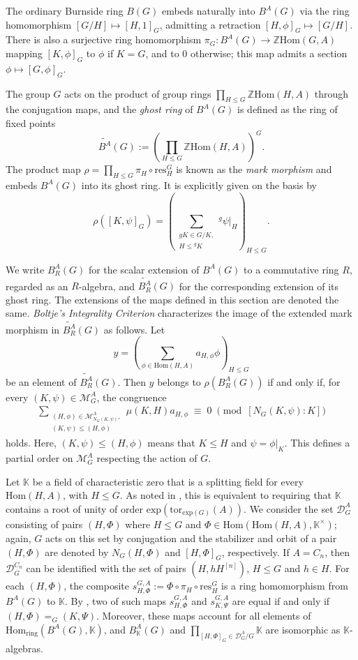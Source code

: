 \documentclass[letterpaper,12pt]{article}
\theoremstyle{plain}
\theoremstyle{definition}
\newcommand{\Z}{\mathbb{Z}}
\newcommand{\K}{\mathbb{K}}
\newcommand{\BAG}{B^A(G)}
\newcommand{\gBAG}{\widetilde{B^A}(G)}
\newcommand{\BAKG}{B^A_{\mathbb{K}}(G)}
\newcommand{\MAG}{\mathcal{M}^A_G}
\newcommand{\DAG}{\mathcal{D}^A_G}
\newcommand{\DnG}{\mathcal{D}^{C_n}_G}
\newcommand{\sGAHPhi}{s^{G,A}_{H,\Phi}}
\begin{document}
The ordinary Burnside ring $B(G)$ embeds naturally into $B^A(G)$ via the ring homomorphism $[G/H]\mapsto[H,1]_G$, admitting a retraction $[H,\phi]_G\mapsto [G/H]$. There is also a surjective ring homomorphism $\pi_G:\BAG\longrightarrow \Z\mathrm{Hom}(G,A)$ mapping $[K,\phi]_G$ to $\phi$ if $K=G$, and to $0$ otherwise; this map admits a section $\phi\mapsto [G,\phi]_G$. 

The group $G$ acts on the product of group rings $\prod_{H\leq G}\Z\mathrm{Hom}(H,A)$ through the conjugation maps, and the \textit{ghost ring} of $\BAG$ is defined as the ring of fixed points 
$$\gBAG:=\left(\prod_{H\leq G}\Z\mathrm{Hom}(H,A)\right)^G.$$ 
The product map $\rho=\prod_{H\leq G}\pi_H\circ \mathrm{res}^G_H$ is known as the \textit{mark morphism} and embeds $\BAG$ into its ghost ring. It is explicitly given on the basis by
\[\rho\left([K,\psi]_G\right)= \left(\sum_{\substack{
gK\in G/K,\\
H\leq {^gK}
}}{^g\psi|_H}\right)_{H\leq G}.\]

We write $B^A_R(G)$ for the scalar extension of $\BAG$ to a commutative ring $R$, regarded as an $R$-algebra, and $\widetilde{B^A_R}(G)$ for the corresponding extension of its ghost ring. The extensions of the maps defined in this section are denoted the same. \textit{Boltje's Integrality Criterion} \cite[Theorem 2.2]{Bol1} characterizes the image of the extended mark morphism in $\widetilde{B^A_R}(G)$ as follows. Let
$$y=\left(\sum_{\phi\in \mathrm{Hom}(H,A)}a_{H,\phi}\phi\right)_{H\leq G}$$ 
be an element of $\widetilde{B^A_R}(G)$. Then $y$ belongs to $\rho\left(B^A_R(G)\right)$ if and only if, for every $(K,\psi)\in \MAG$, the congruence
\begin{align}
    \sum_{
    \substack{
    (H,\phi)\in \mathcal{M}^A_{N_G(K,\psi)},\\
    (K,\psi)\leq (H,\phi)
    }}
    \mu(K,H)a_{H,\phi}\; \equiv \; 0 \; \pmod{\left[N_G(K,\psi):K\right]}
\end{align}
holds. Here, $(K,\psi)\leq (H,\phi)$ means that $K\leq H$ and $\psi=\phi|_K$. This defines a partial order on $\MAG$ respecting the action of $G$.

Let $\K$ be a field of characteristic zero that is a splitting field for every $\mathrm{Hom}(H,A)$, with $H\leq G$. As noted in \cite[\S 3]{BolYil}, this is equivalent to requiring that $\K$ contains a root of unity of order $\mathrm{exp}\left(\mathrm{tor}_{\mathrm{exp}(G)}(A)\right)$. We consider the set $\DAG$ consisting of pairs $(H,\Phi)$ where $H\leq G$ and $\Phi \in \mathrm{Hom}(\mathrm{Hom}(H,A),\K^{\times})$; again, $G$ acts on this set by conjugation and the stabilizer and orbit of a pair $(H,\Phi)$ are denoted by $N_G(H,\Phi)$ and $[H,\Phi]_G$, respectively. If $A=C_n$, then $\DnG$ can be identified with the set of pairs $\left(H,hH^{[n]}\right)$, $H\leq G$ and $h\in H$. For each $(H,\Phi)$, the composite $\sGAHPhi:=\Phi\circ \pi_H\circ \mathrm{res}^G_H$ is a ring homomorphism from $\BAG$ to $\K$. By \cite{BolYil}, two of such maps $\sGAHPhi$ and $s^{G,A}_{K,\Psi}$ are equal if and only if $(H,\Phi)=_G (K,\Psi)$. Moreover, these maps account for all elements of $\mathrm{Hom}_{\mathrm{ring}}\left(\BAG,\K\right)$, and $\BAKG$ and $\prod_{[H,\Phi]_G\in \DAG/G}\K$ are isomorphic as $\K$-algebras. 
\end{document}
